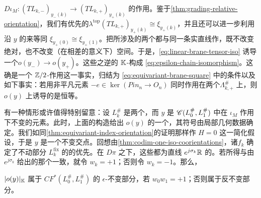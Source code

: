 \trCovering{}$D\iota_M\colon(TL_{k,-})_{y_-(k)}\longrightarrow(TL_{k,+})_{y_+(k)}$ 的作用。鉴于\cref{thm:grading-relative-orientation}，我们有优先的\trIsomorphism{}$\lambda^{\mathrm{top}}(TL_{k,+})_{y_+(k)}\cong\xi_{y_+(k)}$，并且还可以进一步利用沿 $y$ 的\trParallelTransport{}来等同 $\xi_{y_+(0)}\cong\xi_{y_+(1)}$。把所涉及的两个\trLinear\trLagrange\trBrane{}都与同一条实直线作\trTensorProduct{}，既不改变绝对\trIndex{}，也不改变（在相差\trCanonical\trIsomorphism{}的意义下）\trOrientation{}空间。于是，\eqref{eq:linear-brane-tensor-iso} 诱导一个\trIsomorphism{}$o(y_-)\to o(y_+)$。这些\trIsomorphism{}之逆的 $\mathbb{K}$-\trNormalization{}构成 \eqref{eq:epsilon-chain-isomorphism}。这确是一个 $\mathbb{Z}/2$-作用这一事实，归结为 \eqref{eq:equivariant-brane-square} 中的条件以及如下事实：若用非平凡元素 $-e\in\ker(Pin_n\to O_n)$ 同时作用在两个\trLinear\trLagrange\trBrane{}$\Lambda^{\#}_{k,+}$ 上，则 $o(y)$ 上诱导的\trAutomorphism{}是恒等。\par\endgroup
有一种情形或许值得特别留意：设 $L^{\#}_k$ 是两个\trEquivariant\trBrane{}，而 $y$ 是 $\mathscr{C}(L^{\#}_0,L^{\#}_1)$ 中在 $\iota_M$ 作用下不变的元素。此时，上面的构造给出 $o(y)$ 的一个\trAutomorphism{}，其符号由局部几何数据确定。我们如同\cref{thm:equivariant-index-orientation}的证明那样作 $H=0$ 这一简化假设，于是 $y$ 是一个不变交点。回想由\cref{thm:codim-one-iso-coorientations}，诸\trIsomorphism{}$f_k$ 确定了不动部分 $L_k^{\mathrm{fix}}$ 的\trNormalBundle{}的优先\trTrivialization{}。在 $D\pi$ 之下，这些\trTrivialization{}都\trProjection{}为直线 $e^{j\sigma_k}\mathbb{R}$ 的\trOrientation。若所得\trOrientation{}与由\trGenerator{}$e^{j\sigma_k}$ 给出的那个一致，就令 $w_k=+1$；否则令 $w_k=-1$。那么，
\begin{lemma}\label{thm:epsilon-invariant-part}
$|o(y)|_{\mathbb{K}}$ 属于 $CF^*(L_0^{\#},L_1^{\#})$ 的 $\epsilon$-不变部分，若 $w_0w_1=+1$；否则属于反不变部分。
\end{lemma}
